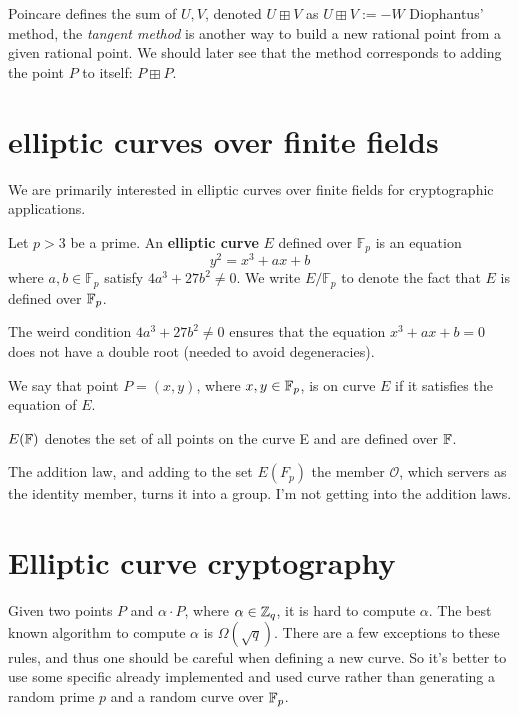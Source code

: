 Poincare defines the sum of $U, V$, denoted $U \boxplus V$ as $U \boxplus V := -W$
Diophantus' method, the \emph{tangent method} is another way to build a new rational point from a given rational point. 
We should later see that the method corresponds to adding the point $P$ to itself: $P\boxplus P$.
\section{elliptic curves over finite fields}
We are primarily interested in elliptic curves over finite fields for cryptographic applications.
\begin{defn}
  Let $p >3 $ be a prime. An \textbf{elliptic curve} $E$ defined over $\mathbb{F}_p$ is an 
  equation  
  $$ y^2 = x^3 +ax + b$$
  where $a,b \in \mathbb{F}_p$ satisfy $4a^3 +27b^2 \neq 0$. We write $E/\mathbb{F}_p$ to denote
  the fact that $E$ is defined over $\mathbb{F}_p$.
\end{defn}
The weird condition $4a^3 +27b^2 \neq 0 $ ensures that the equation 
$ x^3 + ax + b = 0$ does not have a double root (needed to avoid degeneracies).

\begin{defn}
  We say that point $P=(x,y)$, where $x,y \in \mathbb{F}_p$, is on curve $E$ if it satisfies the equation of $E$.
\end{defn}
\begin{defn}
  $E(\mathbb{F})$ denotes the set of all points on the curve E and are defined over $\mathbb{F}$.
\end{defn}

The addition law, and adding to the set $E(F_p)$ the member $\mathcal{O}$,
 which servers as the identity member, turns it into a group. I'm not getting into the addition laws.

\section{Elliptic curve cryptography}


Given two points $P$ and $\alpha \cdot P$, where $\alpha \in \mathbb{Z}_q$, it is hard to compute $\alpha$.
The best known algorithm to compute $\alpha$ is $\Omega(\sqrt{q})$.
There are a few exceptions to these rules, and thus one should be careful when defining a new curve.
So it's better to use some specific already implemented and used curve rather than 
generating a random prime $p$ and a random curve over $\mathbb{F}_p$.
